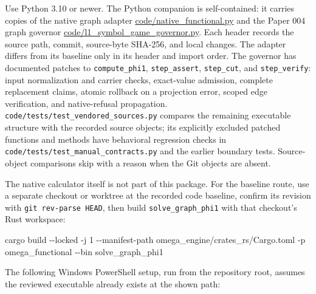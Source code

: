 \documentclass[
  11pt,
]{article}
\newenvironment{Shaded}{}{}
\newcommand{\FunctionTok}[1]{\textcolor[rgb]{0.02,0.16,0.49}{#1}}
\newcommand{\NormalTok}[1]{#1}
\newcommand{\OperatorTok}[1]{\textcolor[rgb]{0.40,0.40,0.40}{#1}}
\newcommand{\VariableTok}[1]{\textcolor[rgb]{0.10,0.09,0.49}{#1}}
\begin{document}
Use Python 3.10 or newer. The Python companion is self-contained: it
carries copies of the native graph adapter
\url{code/native_functional.py} and the Paper 004 graph governor
\url{code/l1_symbol_game_governor.py}. Each header records the source
path, commit, source-byte SHA-256, and local changes. The adapter
differs from its baseline only in its header and import order. The
governor has documented patches to \texttt{compute\_phi1},
\texttt{step\_assert}, \texttt{step\_cut}, and \texttt{step\_verify}:
input normalization and carrier checks, exact-value admission, complete
replacement claims, atomic rollback on a projection error, scoped edge
verification, and native-refusal propagation.
\texttt{code/tests/test\_vendored\_sources.py} compares the remaining
executable structure with the recorded source objects; its explicitly
excluded patched functions and methods have behavioral regression checks
in \texttt{code/tests/test\_manual\_contracts.py} and the earlier
boundary tests. Source-object comparisons skip with a reason when the
Git objects are absent.

The native calculator itself is not part of this package. For the
baseline route, use a separate checkout or worktree at the recorded code
baseline, confirm its revision with \texttt{git\ rev-parse\ HEAD}, then
build \texttt{solve\_graph\_phi1} with that checkout's Rust workspace:

\begin{Shaded}
\begin{Highlighting}[]
\NormalTok{cargo build }\OperatorTok{{-}{-}}\NormalTok{locked }\OperatorTok{{-}}\NormalTok{j 1 }\OperatorTok{{-}{-}}\NormalTok{manifest}\OperatorTok{{-}}\NormalTok{path omega\_engine}\OperatorTok{/}\NormalTok{crates\_rs}\OperatorTok{/}\NormalTok{Cargo}\OperatorTok{.}\FunctionTok{toml} \OperatorTok{{-}}\NormalTok{p omega\_functional }\OperatorTok{{-}{-}}\NormalTok{bin solve\_graph\_phi1}
\end{Highlighting}
\end{Shaded}

The following Windows PowerShell setup, run from the repository root,
assumes the reviewed executable already exists at the shown path:

\begin{Shaded}
\end{Shaded}
\end{document}
